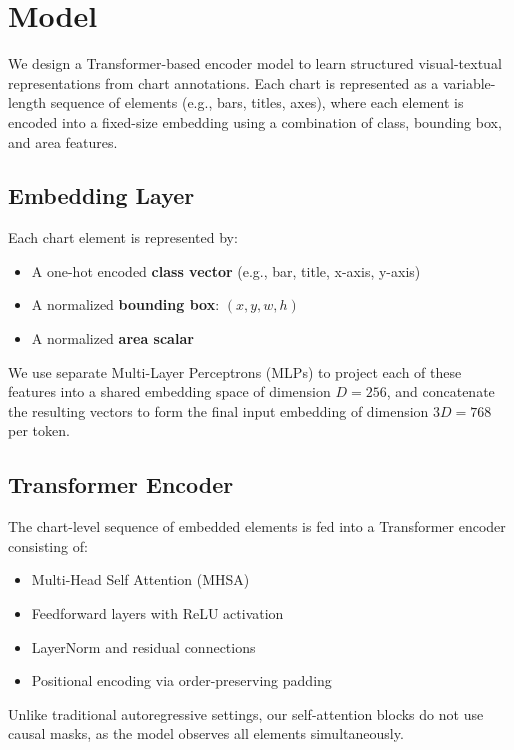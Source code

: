 \documentclass[11pt]{article}
\begin{document}
\section{Model}

We design a Transformer-based encoder model to learn structured visual-textual representations from chart annotations. Each chart is represented as a variable-length sequence of elements (e.g., bars, titles, axes), where each element is encoded into a fixed-size embedding using a combination of class, bounding box, and area features.

\subsection*{Embedding Layer}

Each chart element is represented by:
\begin{itemize}
    \item A one-hot encoded \textbf{class vector} (e.g., bar, title, x-axis, y-axis)
    \item A normalized \textbf{bounding box}: $(x, y, w, h)$
    \item A normalized \textbf{area scalar}
\end{itemize}

We use separate Multi-Layer Perceptrons (MLPs) to project each of these features into a shared embedding space of dimension $D=256$, and concatenate the resulting vectors to form the final input embedding of dimension $3D=768$ per token.

\subsection*{Transformer Encoder}

The chart-level sequence of embedded elements is fed into a Transformer encoder consisting of:
\begin{itemize}
    \item Multi-Head Self Attention (MHSA)
    \item Feedforward layers with ReLU activation
    \item LayerNorm and residual connections
    \item Positional encoding via order-preserving padding
\end{itemize}

Unlike traditional autoregressive settings, our self-attention blocks do not use causal masks, as the model observes all elements simultaneously.
\end{document}
